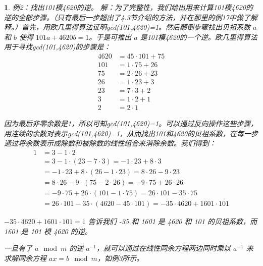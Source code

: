 \documentclass[UTF8]{report}
\theoremstyle{MyLineTheoremStyle} %
\theoremstyle{MyBlockTheoremStyle} %
\theoremstyle{MySubsubsectionStyle} %
\newtheorem{definition}{}
\begin{document}
\begin{definition}
    例2：找出101模4620的逆。
    解：为了完整性，我们给出用来计算101模4620的逆的全部步骤。（只有最后一步超出了4.3节介绍的方法，并在那里的例17中做了解释。）首先，用欧几里得算法证明gcd(101,4620)=1。然后颠倒步骤找出贝祖系数 \( a \) 和 \( b \) 使得 \( 101a + 4620b = 1 \)。于是可推出 \( a \) 是101模4620的一个逆。欧几里得算法用于寻找gcd(101,4620)的步骤是：
    \[
    \begin{aligned}
        4620 &= 45 \cdot 101 + 75 \\
        101 &= 1 \cdot 75 + 26 \\
        75 &= 2 \cdot 26 + 23 \\
        26 &= 1 \cdot 23 + 3 \\
        23 &= 7 \cdot 3 + 2 \\
        3 &= 1 \cdot 2 + 1 \\
        2 &= 2 \cdot 1
    \end{aligned}
    \]

    因为最后非零余数是1，所以可知gcd(101,4620)=1。可以通过反向操作这些步骤，用连续的余数对表示gcd(101,4620)=1，从而找出101和4620的贝祖系数，在每一步通过将余数表示成除数和被除数的线性组合来消除余数。我们得到：
    \[
    \begin{aligned}
        1 &= 3 - 1 \cdot 2 \\
          &= 3 - 1 \cdot (23 - 7 \cdot 3) = -1 \cdot 23 + 8 \cdot 3 \\
          &= -1 \cdot 23 + 8 \cdot (26 - 1 \cdot 23) = 8 \cdot 26 - 9 \cdot 23 \\
          &= 8 \cdot 26 - 9 \cdot (75 - 2 \cdot 26) = -9 \cdot 75 + 26 \cdot 26 \\
          &= -9 \cdot 75 + 26 \cdot (101 - 1 \cdot 75) = 26 \cdot 101 - 35 \cdot 75 \\
          &= 26 \cdot 101 - 35 \cdot (4620 - 45 \cdot 101) = -35 \cdot 4620 + 1601 \cdot 101
    \end{aligned}
    \]

    \(-35 \cdot 4620 + 1601 \cdot 101 = 1\) 告诉我们 -35 和 1601 是 4620 和 101 的贝祖系数，而 1601 是 101 模 4620 的逆。

    一旦有了 \( a \mod m \) 的逆 \( a^{-1} \)，就可以通过在线性同余方程两边同时乘以 \( a^{-1} \) 来求解同余方程 \( ax = b \mod m \)，如例3所示。
\end{definition}
\end{document}
